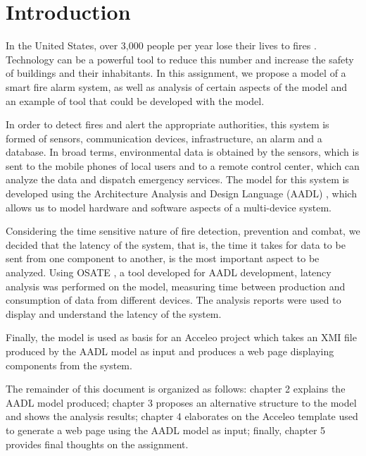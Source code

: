 \section{Introduction}



In the United States, over 3,000 people per year lose their lives to fires \cite{usfiredeaths}. Technology can be a powerful tool to reduce this number and increase the safety of buildings and their inhabitants. In this assignment, we propose a model of a smart fire alarm system, as well as analysis of certain aspects of the model and an example of tool that could be developed with the model.

In order to detect fires and alert the appropriate authorities, this system is formed of sensors, communication devices, infrastructure, an alarm and a database. In broad terms, environmental data is obtained by the sensors, which is sent to the mobile phones of local users and to a remote control center, which can analyze the data and dispatch emergency services. The model for this system is developed using the Architecture Analysis and Design Language (AADL) \cite{aadl}, which allows us to model hardware and software aspects of a multi-device system.

Considering the time sensitive nature of fire detection, prevention and combat, we decided that the latency of the system, that is, the time it takes for data to be sent from one component to another, is the most important aspect to be analyzed. Using OSATE \cite{osate}, a tool developed for AADL development, latency analysis was performed on the model, measuring time between production and consumption of data from different devices. The analysis reports were used to display and understand the latency of the system.

Finally, the model is used as basis for an Acceleo \cite{acceleo} project which takes an XMI file produced by the AADL model as input and produces a web page displaying components from the system.

The remainder of this document is organized as follows: chapter 2 explains the AADL model produced; chapter 3 proposes an alternative structure to the model and shows the analysis results; chapter 4 elaborates on the Acceleo template used to generate a web page using the AADL model as input; finally, chapter 5 provides final thoughts on the assignment.

